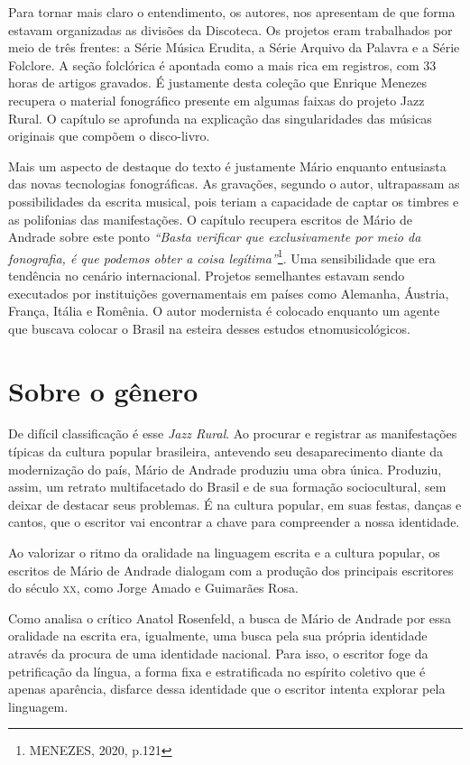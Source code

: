 Para tornar mais claro o entendimento, os autores, nos apresentam de que
forma estavam organizadas as divisões da Discoteca. Os projetos eram
trabalhados por meio de três frentes: a Série Música Erudita, a Série
Arquivo da Palavra e a Série Folclore. A seção folclórica é apontada
como a mais rica em registros, com 33 horas de artigos gravados. É
justamente desta coleção que Enrique Menezes recupera o material
fonográfico presente em algumas faixas do projeto Jazz Rural. O capítulo
se aprofunda na explicação das singularidades das músicas originais que
compõem o disco-livro.

Mais um aspecto de destaque do texto é justamente Mário enquanto
entusiasta das novas tecnologias fonográficas. As gravações, segundo o
autor, ultrapassam as possibilidades da escrita musical, pois teriam a
capacidade de captar os timbres e as polifonias das manifestações. O
capítulo recupera escritos de Mário de Andrade sobre este ponto
\emph{``Basta verificar que exclusivamente por meio da fonografia, é que
podemos obter a coisa legítima''}\footnote{MENEZES, 2020, p.121}. Uma
sensibilidade que era tendência no cenário internacional. Projetos
semelhantes estavam sendo executados por instituições governamentais em
países como Alemanha, Áustria, França, Itália e Romênia. O autor
modernista é colocado enquanto um agente que buscava colocar o Brasil na
esteira desses estudos etnomusicológicos.

\section{Sobre o gênero}

De difícil classificação é esse \textit{Jazz Rural}.
Ao procurar e registrar as manifestações típicas da cultura popular brasileira, antevendo seu desaparecimento diante da modernização do país, Mário de Andrade produziu uma obra única.
Produziu, assim, um retrato
multifacetado do Brasil e de sua formação sociocultural, sem deixar de
destacar seus problemas.
É na cultura popular, em suas festas, danças e cantos, que o escritor vai encontrar a chave para compreender a nossa identidade.

Ao valorizar o ritmo da oralidade na linguagem escrita e a cultura
popular, os escritos de Mário de Andrade dialogam com a produção dos
principais escritores do século \textsc{xx}, como Jorge Amado e Guimarães Rosa.

Como analisa o crítico Anatol Rosenfeld, a busca de Mário de Andrade por essa oralidade na escrita era, igualmente, uma busca pela sua própria identidade através da procura de uma identidade nacional. Para isso, o escritor foge da petrificação da língua, a forma fixa e estratificada no espírito coletivo que é apenas aparência, disfarce dessa identidade que o escritor intenta explorar pela linguagem.

